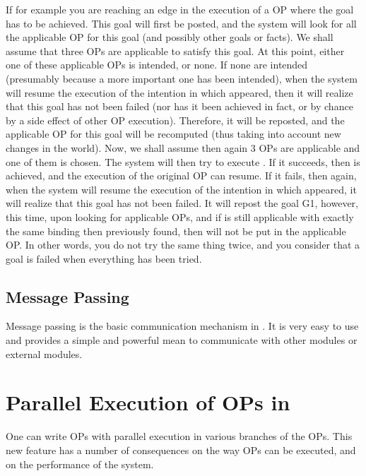If for example you are reaching an edge in the execution of a OP where the goal
 has to be achieved. This goal will first be posted, and the system
will look for all the applicable OP for this goal (and possibly other goals or
facts). We shall assume that three OPs are applicable to satisfy this goal. At this
point, either one of these applicable OPs is intended, or none. If none are
intended (presumably because a more important one has been intended), when the
system will resume the execution of the intention in which  appeared,
then it will realize that this goal has not been failed (nor has it been
achieved in fact, or by chance by a side effect of other OP execution).
Therefore, it will be reposted, and the applicable OP for this goal will be
recomputed (thus taking into account new changes in the world). Now, we shall
assume then again 3 OPs are applicable and  one of them is chosen.
The system will then try to execute . If it succeeds, then 
is achieved, and the execution of the original OP can resume. If it fails, then
again, when the system will resume the execution of the intention in which
 appeared, it will realize that this goal has not been failed. It
will repost the goal G1, however, this time, upon looking for applicable OPs,
and if  is still applicable with exactly the same binding then
previously found, then  will not be put in the applicable OP. In
other words, you do not try the same thing twice, and you consider that a goal
is failed when everything has been tried.

\section{Message Passing}

Message passing is the basic communication mechanism in \COPRS{}. It is
very easy to use and provides a simple and powerful mean to communicate
with other \COPRS{} modules or external modules.

\chapter{Parallel Execution of OPs in \COPRS{}}

One can write OPs with parallel execution in various
branches of the OPs. This new feature has a number of consequences on the way
OPs can be executed, and on the performance of the system.



